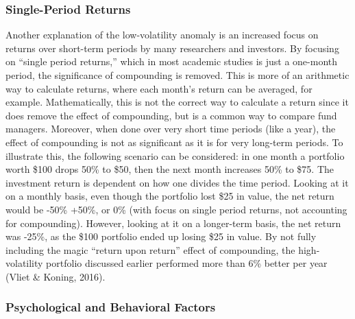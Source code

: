\documentclass[12pt,twoside]{reedthesis}
\theoremstyle{definition}
\theoremstyle{definition}
\theoremstyle{definition}
\theoremstyle{remark}
\begin{document}
\subsubsection{Single-Period Returns}\label{single-period-returns}

Another explanation of the low-volatility anomaly is an increased focus
on returns over short-term periods by many researchers and investors. By
focusing on ``single period returns,'' which in most academic studies is
just a one-month period, the significance of compounding is removed.
This is more of an arithmetic way to calculate returns, where each
month's return can be averaged, for example. Mathematically, this is not
the correct way to calculate a return since it does remove the effect of
compounding, but is a common way to compare fund managers. Moreover,
when done over very short time periods (like a year), the effect of
compounding is not as significant as it is for very long-term periods.
To illustrate this, the following scenario can be considered: in one
month a portfolio worth \$100 drops 50\% to \$50, then the next month
increases 50\% to \$75. The investment return is dependent on how one
divides the time period. Looking at it on a monthly basis, even though
the portfolio lost \$25 in value, the net return would be -50\% +50\%,
or 0\% (with focus on single period returns, not accounting for
compounding). However, looking at it on a longer-term basis, the net
return was -25\%, as the \$100 portfolio ended up losing \$25 in value.
By not fully including the magic ``return upon return'' effect of
compounding, the high-volatility portfolio discussed earlier performed
more than 6\% better per year (Vliet \& Koning, 2016).

\subsubsection{Psychological and Behavioral
Factors}\label{psychological-and-behavioral-factors}
\end{document}

